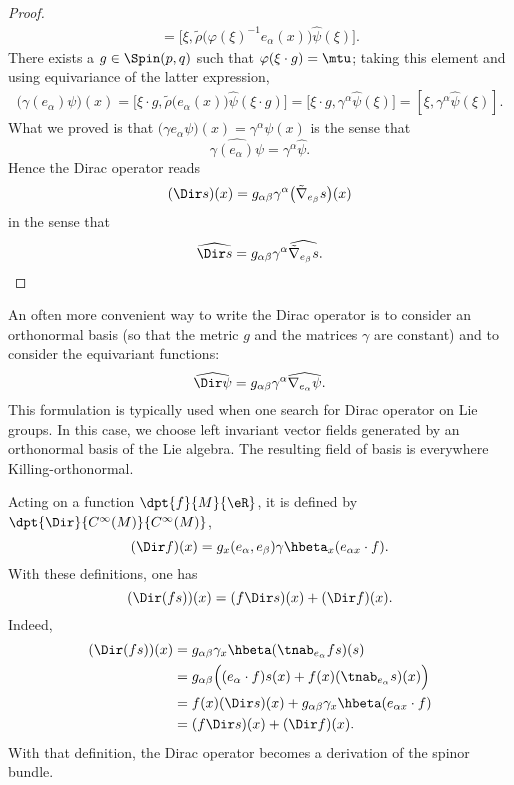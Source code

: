 \begin{proof}
\begin{align*}
		=\big[ \xi,\tilde\rho\big( \varphi(\xi)^{-1}e_{\alpha}(x) \big)\hat{\psi}(\xi) \big].
\end{align*}
There exists a $g\in\Spin(p,q)$ such that $\varphi(\xi\cdot g)=\mtu$; taking this element and using equivariance of the latter expression,
\begin{align}
  \big( \gamma(e_{\alpha})\psi \big)(x)=\big[ \xi\cdot g,\tilde\rho\big( e_{\alpha}(x) \big)\hat{\psi}(\xi\cdot g) \big]
		=\big[ \xi\cdot g,\gamma^{\alpha}\hat{\psi}(\xi) \big]
		=[\xi,\gamma^{\alpha}\hat{\psi}(\xi)].
\end{align}
What we proved is that $\big( \gamma e_{\alpha}\psi \big)(x)=\gamma^{\alpha}\psi(x)$ is the sense that
\begin{equation}
	\widehat{\gamma(e_{\alpha})\psi}=\gamma^{\alpha}\hat{\psi}.
\end{equation}
Hence the Dirac operator reads
\[
  (\Dir s)(x)=g_{\alpha\beta}\gamma^{\alpha}\big( \tilde\nabla_{e_{\beta}}s \big)(x)
\]
in the sense that
\begin{equation}
\widehat{\Dir s}=g_{\alpha\beta}\gamma^{\alpha}\widehat{  \tilde\nabla_{e_{\beta}}s }.
\end{equation}

\end{proof}


An often more convenient way to write the Dirac operator is to consider an orthonormal basis (so that the metric $g$ and the matrices $\gamma$ are constant) and to consider the equivariant functions:
\[
  \widehat{\Dir\psi}=g_{\alpha\beta}\gamma^{\alpha}\widehat{\nabla_{e_{\alpha}}\psi}.
\]
This formulation is typically used when one search for Dirac operator on Lie groups. In this case, we choose left invariant vector fields generated by an orthonormal basis of the Lie algebra. The resulting field of basis is everywhere Killing-orthonormal.

Acting on a function $\dpt{f}{M}{\eR}$, it is defined by $\dpt{\Dir}{C^{\infty}(M)}{C^{\infty}(M)}$,
\begin{equation} \label{eq_defDirac_f}
(\Dir f)(x)=g_x(e_{\alpha},e_{\beta})\gamma\hbeta_x(e_{\alpha x}\cdot f).
\end{equation}
With these definitions, one has
\[(\Dir(fs))(x)=(f\Dir s)(x)+(\Dir f)(x).\] Indeed,
\begin{equation}
\begin{split}
   (\Dir(fs))(x)&=g_{\alpha\beta}\gamma_x\hbeta(\tnab_{e_{\alpha}}fs)(s)\\
                &=g_{\alpha\beta}\Big((e_{\alpha}\cdot f)s(x)+f(x)(\tnab_{e_{\alpha}}s)(x)\Big)\\
                &=f(x)(\Dir s)(x)+g_{\alpha\beta}\gamma_x\hbeta(e_{\alpha x}\cdot f)\\
                &=(f\Dir s)(x)+(\Dir f)(x).
\end{split}
\end{equation}
With that definition, the Dirac operator becomes a derivation of the spinor bundle.


